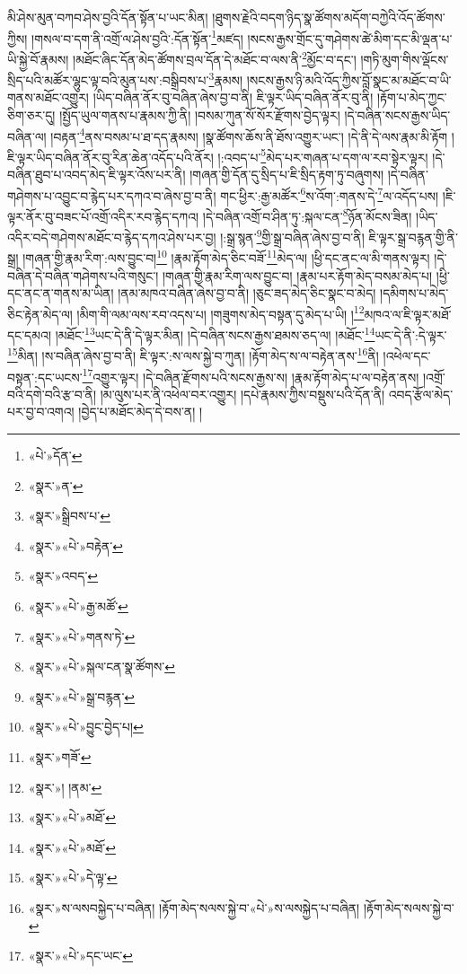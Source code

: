 མི་ཤེས་མུན་བཀབ་ཤེས་བྱའི་དོན་སྟོན་པ་ཡང་མིན། །ཐུགས་རྗེའི་བདག་ཉིད་སྣ་ཚོགས་མདོག་བཀྱེའི་འོད་ཚོགས་ཀྱིས། །གསལ་བ་དག་ནི་འགྲོ་ལ་ཤེས་བྱའི་:དོན་སྟོན་\footnote{«པེ་»དོན་}མཛད། །སངས་རྒྱས་གྲོང་དུ་གཤེགས་ཚེ་མིག་དང་མི་ལྡན་པ་ཡི་སྐྱེ་བོ་རྣམས། །མཐོང་ཞིང་དོན་མེད་ཚོགས་བྲལ་དོན་དེ་མཐོང་བ་ལས་ནི་\footnote{«སྣར་»ན་}མྱོང་བ་དང་། །གཏི་མུག་གིས་ལྡོངས་སྲིད་པའི་མཚོར་ལྷུང་ལྟ་བའི་མུན་པས་:བསྒྲིབས་པ་\footnote{«སྣར་»སྒྲིབས་པ་}རྣམས། །སངས་རྒྱས་ཉི་མའི་འོད་ཀྱིས་བློ་སྣང་མ་མཐོང་བ་ཡི་གནས་མཐོང་འགྱུར། །ཡིད་བཞིན་ནོར་བུ་བཞིན་ཞེས་བྱ་བ་ནི། ཇི་ལྟར་ཡིད་བཞིན་ནོར་བུ་ནི། །རྟོག་པ་མེད་ཀྱང་ཅིག་ཅར་དུ། །སྤྱོད་ཡུལ་གནས་པ་རྣམས་ཀྱི་ནི། །བསམ་ཀུན་སོ་སོར་རྫོགས་བྱེད་ལྟར། །དེ་བཞིན་སངས་རྒྱས་ཡིད་བཞིན་ལ། །བརྟན་\footnote{«སྣར་»«པེ་»བརྟེན་}ནས་བསམ་པ་ཐ་དད་རྣམས། །སྣ་ཚོགས་ཆོས་ནི་ཐོས་འགྱུར་ཡང་། །དེ་ནི་དེ་ལས་རྣམ་མི་རྟོག །ཇི་ལྟར་ཡིད་བཞིན་ནོར་བུ་རིན་ཆེན་འདོད་པའི་ནོར། །:འབད་པ་\footnote{«སྣར་»འབད་}མེད་པར་གཞན་པ་དག་ལ་རབ་སྟེར་ལྟར། །དེ་བཞིན་ཐུབ་པ་འབད་མེད་ཇི་ལྟར་འོས་པར་ནི། །གཞན་གྱི་དོན་དུ་སྲིད་པ་ཇི་སྲིད་རྟག་ཏུ་བཞུགས། །དེ་བཞིན་གཤེགས་པ་འབྱུང་བ་རྙེད་པར་དཀའ་བ་ཞེས་བྱ་བ་ནི། གང་ཕྱིར་:རྒྱ་མཚོར་\footnote{«སྣར་»«པེ་»རྒྱ་མཚོ་}ས་འོག་:གནས་དེ་\footnote{«སྣར་»«པེ་»གནས་ཏེ་}ལ་འདོད་པས། །ཇི་ལྟར་ནོར་བུ་བཟང་པོ་འགྲོ་འདིར་རབ་རྙེད་དཀའ། །དེ་བཞིན་འགྲོ་བ་ཤིན་ཏུ་:སྐལ་ངན་\footnote{«སྣར་»«པེ་»སྐལ་ངན་སྣ་ཚོགས་}ཉོན་མོངས་ཟིན། །ཡིད་འདིར་བདེ་གཤེགས་མཐོང་བ་རྙེད་དཀའ་ཤེས་པར་བྱ། །:སྒྲ་སྙན་\footnote{«སྣར་»«པེ་»སྒྲ་བརྙན་}གྱི་སྒྲ་བཞིན་ཞེས་བྱ་བ་ནི། ཇི་ལྟར་སྒྲ་བརྙན་གྱི་ནི་སྒྲ། །གཞན་གྱི་རྣམ་རིག་:ལས་བྱུང་བ།\footnote{«སྣར་»«པེ་»བྱུང་བྱེད་པ།} །རྣམ་རྟོག་མེད་ཅིང་བཟོ་\footnote{«སྣར་»གཟོ་}མེད་ལ། །ཕྱི་དང་ནང་ལ་མི་གནས་ལྟར། །དེ་བཞིན་དེ་བཞིན་གཤེགས་པའི་གསུང་། །གཞན་གྱི་རྣམ་རིག་ལས་བྱུང་བ། །རྣམ་པར་རྟོག་མེད་བསམ་མེད་པ། །ཕྱི་དང་ནང་ན་གནས་མ་ཡིན། །ནམ་མཁའ་བཞིན་ཞེས་བྱ་བ་ནི། །ཅུང་ཟད་མེད་ཅིང་སྣང་བ་མེད། །དམིགས་པ་མེད་ཅིང་རྟེན་མེད་ལ། །མིག་གི་ལམ་ལས་རབ་འདས་པ། །གཟུགས་མེད་བསྟན་དུ་མེད་པ་ཡི། །\footnote{«སྣར་»། །ནམ་}མཁའ་ལ་ཇི་ལྟར་མཐོ་དང་དམའ། །མཐོང་\footnote{«སྣར་»«པེ་»མཐོ་}ཡང་དེ་ནི་དེ་ལྟར་མིན། །དེ་བཞིན་སངས་རྒྱས་ཐམས་ཅད་ལ། །མཐོང་\footnote{«སྣར་»«པེ་»མཐོ་}ཡང་དེ་ནི་:དེ་ལྟར་\footnote{«སྣར་»«པེ་»དེ་ལྟ་}མིན། །ས་བཞིན་ཞེས་བྱ་བ་ནི། ཇི་ལྟར་:ས་ལས་སྐྱེ་བ་ཀུན། །རྟོག་མེད་ས་ལ་བརྟེན་ནས་\footnote{«སྣར་»ས་ལསབསྐྱེད་པ་བཞིན། །རྟོག་མེད་སལས་སྐྱེ་བ་«པེ་»ས་ལསསྐྱེད་པ་བཞིན། །རྟོག་མེད་སལས་སྐྱེ་བ་}ནི། །འཕེལ་དང་བསྟན་:དང་ཡངས་\footnote{«སྣར་»«པེ་»དང་ཡང་}འགྱུར་ལྟར། །དེ་བཞིན་རྫོགས་པའི་སངས་རྒྱས་ས། །རྣམ་རྟོག་མེད་པ་ལ་བརྟེན་ནས། །འགྲོ་བའི་དགེ་བའི་རྩ་བ་ནི། །མ་ལུས་པར་ནི་འཕེལ་བར་འགྱུར། །དཔེ་རྣམས་ཀྱིས་བསྡུས་པའི་དོན་ནི། འབད་རྩོལ་མེད་པར་བྱ་བ་འགའ། །བྱེད་པ་མཐོང་མེད་དེ་བས་ན། །
